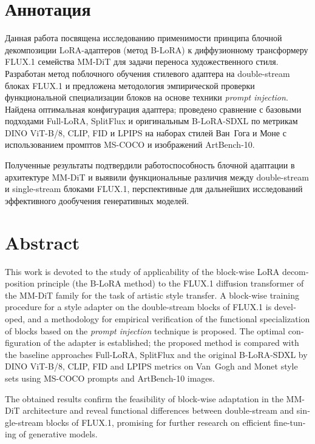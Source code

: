 \documentclass[14pt,a4paper]{extarticle}
\begin{document}


\section*{Аннотация}

Данная работа посвящена исследованию применимости принципа блочной
декомпозиции LoRA-адаптеров (метод B-LoRA) к диффузионному трансформеру
FLUX.1 семейства MM-DiT для задачи переноса художественного стиля.
Разработан метод поблочного обучения стилевого адаптера на double-stream
блоках FLUX.1 и предложена методология эмпирической проверки функциональной
специализации блоков на основе техники \textit{prompt injection}. Найдена
оптимальная конфигурация адаптера; проведено сравнение с базовыми подходами
Full-LoRA, SplitFlux и оригинальным B-LoRA-SDXL по метрикам DINO ViT-B/8,
CLIP, FID и LPIPS на наборах стилей Ван~Гога и Моне с использованием
промптов MS-COCO и изображений ArtBench-10.

Полученные результаты подтвердили работоспособность блочной адаптации
в архитектуре MM-DiT и выявили функциональные различия между double-stream
и single-stream блоками FLUX.1, перспективные для дальнейших исследований
эффективного дообучения генеративных моделей.
\newpage

\section*{Abstract}
\begin{otherlanguage}{english}
This work is devoted to the study of applicability of the block-wise LoRA
decomposition principle (the B-LoRA method) to the FLUX.1 diffusion
transformer of the MM-DiT family for the task of artistic style transfer.
A block-wise training procedure for a style adapter on the double-stream
blocks of FLUX.1 is developed, and a methodology for empirical verification
of the functional specialization of blocks based on the \textit{prompt
injection} technique is proposed. The optimal configuration of the adapter
is established; the proposed method is compared with the baseline approaches
Full-LoRA, SplitFlux and the original B-LoRA-SDXL by DINO ViT-B/8, CLIP,
FID and LPIPS metrics on Van~Gogh and Monet style sets using MS-COCO prompts
and ArtBench-10 images.

The obtained results confirm the feasibility of block-wise adaptation in the
MM-DiT architecture and reveal functional differences between double-stream
and single-stream blocks of FLUX.1, promising for further research on
efficient fine-tuning of generative models.
\end{otherlanguage}
\newpage
\end{document}
